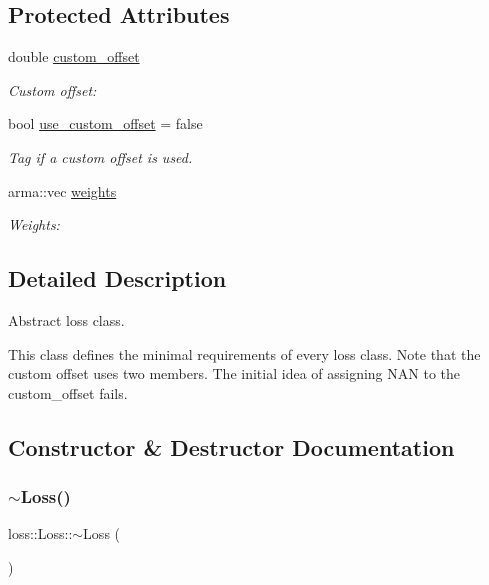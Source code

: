 \subsection*{Protected Attributes}
\begin{DoxyCompactItemize}
\item 
double \hyperlink{classloss_1_1_loss_ae5dc373f54ed65ee0ca54a921ef826f4}{custom\+\_\+offset}
\begin{DoxyCompactList}\small\item\em Custom offset\+: \end{DoxyCompactList}\item 
bool \hyperlink{classloss_1_1_loss_a5fabbbb104e6f430498630130ac8a131}{use\+\_\+custom\+\_\+offset} = false
\begin{DoxyCompactList}\small\item\em Tag if a custom offset is used. \end{DoxyCompactList}\item 
arma\+::vec \hyperlink{classloss_1_1_loss_a4cfecaa4e3a6244ec82651607340e751}{weights}
\begin{DoxyCompactList}\small\item\em Weights\+: \end{DoxyCompactList}\end{DoxyCompactItemize}


\subsection{Detailed Description}
Abstract loss class. 

This class defines the minimal requirements of every loss class. Note that the custom offset uses two members. The initial idea of assigning {\ttfamily N\+AN} to the {\ttfamily custom\+\_\+offset} fails. 

\subsection{Constructor \& Destructor Documentation}
\mbox{\label{classloss_1_1_loss_a868a7908fd97590b6c4fc69f4eb3c570}} 
\subsubsection{\texorpdfstring{$\sim$\+Loss()}{~Loss()}}
{\footnotesize\ttfamily loss\+::\+Loss\+::$\sim$\+Loss (\begin{DoxyParamCaption}{ }\end{DoxyParamCaption})\hspace{0.3cm}{\ttfamily [virtual]}}



